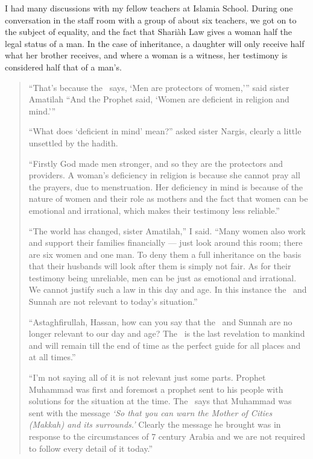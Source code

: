 \documentclass[12pt]{memoir}
\begin{document}
I had many discussions with my fellow teachers at Islamia School.
During one conversation in the staff room with a group of about six teachers,
we got on to the subject of equality,
and the fact that Shari\`ah Law gives a woman half the legal status of a man.
In the case of inheritance, a daughter will only receive half
what her brother receives, and where a woman is a witness,
her testimony is considered half that of a man’s.

\begin{quote}
“That’s because the \Quran\ says, ‘Men are protectors of women,’”
said sister Amatilah
“And the Prophet said, ‘Women are deficient in religion and mind.’”

“What does ‘deficient in mind’ mean?” asked sister Nargis,
clearly a little unsettled by the hadith.

“Firstly God made men stronger, and so they are the protectors and providers.
A woman’s deficiency in religion is because
she cannot pray all the prayers, due to menstruation.
Her deficiency in mind is because of the nature of women and their role
as mothers and the fact that women can be emotional and irrational,
which makes their testimony less reliable.”

“The world has changed, sister Amatilah,” I said.
“Many women also work and support their families financially —
just look around this room; there are six women and one man.
To deny them a full inheritance on the basis that their husbands
will look after them is simply not fair.
As for their testimony being unreliable,
men can be just as emotional and irrational.
We cannot justify such a law in this day and age.
In this instance the \Quran\ and Sunnah
are not relevant to today’s situation.”

“Astaghfirullah, Hassan, how can you say that the \Quran\ and Sunnah
are no longer relevant to our day and age?
The \Quran\ is the last revelation to mankind and will remain
till the end of time as the perfect guide for all places and at all times.”

“I’m not saying all of it is not relevant just some parts.
Prophet Muhammad was first and foremost a prophet
sent to his people with solutions for the situation at the time.
The \Quran\ says that Muhammad was sent with the message
\emph{‘So that you can warn the Mother of Cities (Makkah)
and its surrounds.’}
Clearly the message he brought was in response
to the circumstances of 7 century Arabia
and we are not required to follow every detail of it today.”


\end{quote}
\end{document}
